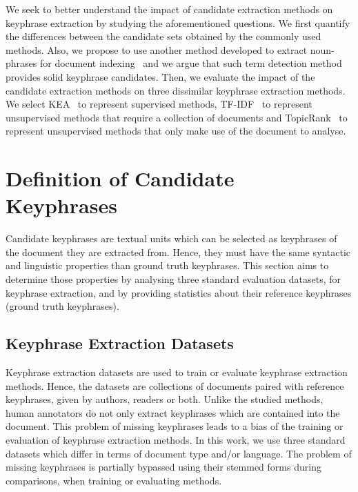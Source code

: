   We seek to better understand the impact of candidate extraction methods on
  keyphrase extraction by studying the aforementioned questions. We first
  quantify the differences between the candidate sets obtained by the commonly
  used methods. Also, we propose to use another method developed to extract
  noun-phrases for document indexing~\cite{evans1996nounphraseanalysis} and we
  argue that such term detection
  method~\cite{castellvi2001automatictermdetection} provides solid keyphrase
  candidates. Then, we evaluate the impact of the candidate extraction methods
  on three dissimilar keyphrase extraction methods. We select
  KEA~\cite{witten1999kea} to represent supervised methods,
  TF-IDF~\cite{jones1972tfidf} to represent unsupervised methods that require a
  collection of documents and TopicRank~\cite{bougouin2013topicrank} to
  represent unsupervised methods that only make use of the document to analyse.


\section{Definition of Candidate Keyphrases}
\label{sec:study_of_ground_truth_keyphrases}
  Candidate keyphrases are textual units which can be selected as keyphrases
  of the document they are extracted from. Hence, they must have the same
  syntactic and linguistic properties than ground truth keyphrases. This section
  aims to determine those properties by analysing three standard evaluation
  datasets, for keyphrase extraction, and by providing statistics about their
  reference keyphrases (ground truth keyphrases).

  \subsection{Keyphrase Extraction Datasets}
  \label{subsec:keyphrase_extraction_datasets}
    Keyphrase extraction datasets are used to train or evaluate keyphrase
    extraction methods. Hence, the datasets are collections of documents paired
    with reference keyphrases, given by authors, readers or both. Unlike the
    studied methods, human annotators do not only extract keyphrases which are
    contained into the document. This problem of missing keyphrases leads to a
    bias of the training or evaluation of keyphrase extraction methods. In this
    work, we use three standard datasets which differ in terms of document type
    and/or language. The problem of missing keyphrases is partially bypassed
    using their stemmed forms during comparisons, when training or evaluating
    methods.

